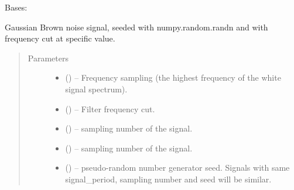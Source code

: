 \documentclass[letterpaper,10pt,english]{sphinxmanual}
\begin{document}

\begin{fulllineitems}
\label{\detokenize{triflow.plugins:triflow.plugins.signals.GaussianBrownNoise}}
Bases: {\hyperref[\detokenize{triflow.plugins:triflow.plugins.signals.GaussianWhiteNoise}]{}}

Gaussian Brown noise signal, seeded with numpy.random.randn and with frequency cut at specific value.
\begin{quote}\begin{description}
\item[{Parameters}] \leavevmode\begin{itemize}
\item {} 
 () -- Frequency sampling (the highest frequency of the white signal spectrum).

\item {} 
 () -- Filter frequency cut.

\item {} 
 (\sphinxstyleliteralemphasis{, }\sphinxstyleliteralemphasis{, }) -- sampling number of the signal.

\item {} 
 (\sphinxstyleliteralemphasis{, }\sphinxstyleliteralemphasis{, }) -- sampling number of the signal.

\item {} 
 (\sphinxstyleliteralemphasis{, }) -- pseudo-random number generator seed. Signals with same signal\_period, sampling number and seed will be similar.


\end{itemize}
\end{description}
\end{quote}
\end{fulllineitems}
\end{document}
